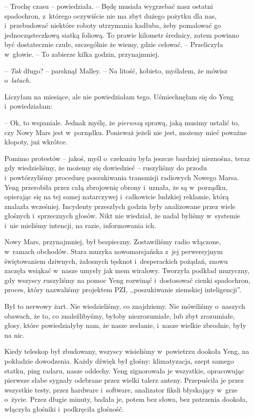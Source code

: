 \documentclass[oneside,polish,11pt,sfheadings]{mwbk}
\begin{document}
-- Trochę czasu -- powiedziała. -- Będę musiała
wygrzebać nasz ostatni spadochron, z~którego oczywiście nie ma zbyt
dużego pożytku dla nas, i~przebudować niektóre roboty utrzymania
kadłuba, żeby pomalować go jednocząsteczkową siatką foliową. To prawie
kilometr średnicy, zatem powinno być dostatecznie czułe, szczególnie że
wiemy, gdzie celować. -- Przeliczyła w~głowie. -- To zabierze kilka
godzin, przynajmniej.

-- \textit{Tak} długo? -- parsknął Malley. -- Na litość, kobieto, myślałem,
że mówisz o~\textit{latach}.

Liczyłam na miesiące, ale nie powiedziałam tego. Uśmiechnęłam się do
Yeng i~powiedziałam:

-- Ok, to wspaniale. Jednak myślę, że \textit{pierwszą} sprawą, jaką musimy
ustalić to, czy Nowy Mars jest w~porządku. Ponieważ jeżeli nie jest,
możemy mieć poważne kłopoty, już wkrótce.

Pomimo protestów -- jakoś, myśl o~czekaniu była jeszcze bardziej
nieznośna, teraz gdy wiedzieliśmy, że możemy się dowiedzieć -- ruszyliśmy
do przodu i~powtórzyliśmy procedurę poszukiwania transmisji radiowych
Nowego Marsa. Yeng przerobiła przez całą zbrojownię obrony i~uznała, że
są w~porządku, opierając się na tej samej natarczywej i~całkowicie
ludzkiej reklamie, którą znalazła wcześniej. Incydenty przeszłych godzin
były analizowane przez wiele głośnych i~sprzecznych głosów. Nikt nie
wiedział, że nadal byliśmy w~systemie i~nie mieliśmy intencji, na razie,
informowania ich.

Nowy Mars, przynajmniej, był bezpieczny. Zostawiliśmy radio włączone, w~ramach obchodów. Stara muzyka nowomarsjańska z~jej perwersyjnym
świętowaniem dziwnych, żałosnych tęsknot i~desperackich pożądań, znowu
zaczęła wsiąkać w~nasze umysły jak mem wiralowy. Tworzyła podkład
muzyczny, gdy wszyscy ruszyliśmy na pomoc Yeng rozwinąć i~dostosować
cienki spadochron, proces, który nazwaliśmy projektem PZI,
,,poszukiwanie ziemskiej inteligencji''.

Był to nerwowy żart. Nie wiedzieliśmy, co znajdziemy. Nie mówiliśmy o~naszych obawach, że to, co znaleźlibyśmy, byłoby niezrozumiałe, lub zbyt
zrozumiałe, głosy, które powiedziałyby nam, że nasze zesłanie, i~nasze
wielkie zbrodnie, były na nic.

Kiedy teleskop był zbudowany, wszyscy wisieliśmy w~powietrzu dookoła
Yeng, na pokładzie dowodzenia. Każdy dźwięk był głośny: klimatyzacja,
szept samego statku, ping radaru, nasze oddechy. Yeng zignorowała je
wszystkie, opracowując pierwsze słabe sygnały odebrane przez wielki
talerz anteny. Przepuściła je przez wszystkie testy, przez hardware i~software, analizator fiksli błyskający w~grze o~życie. Przez długie
minuty, badała je, potem bez słowa, bez patrzenia dookoła, włączyła
głośniki i~podkręciła głośność.
\end{document}
